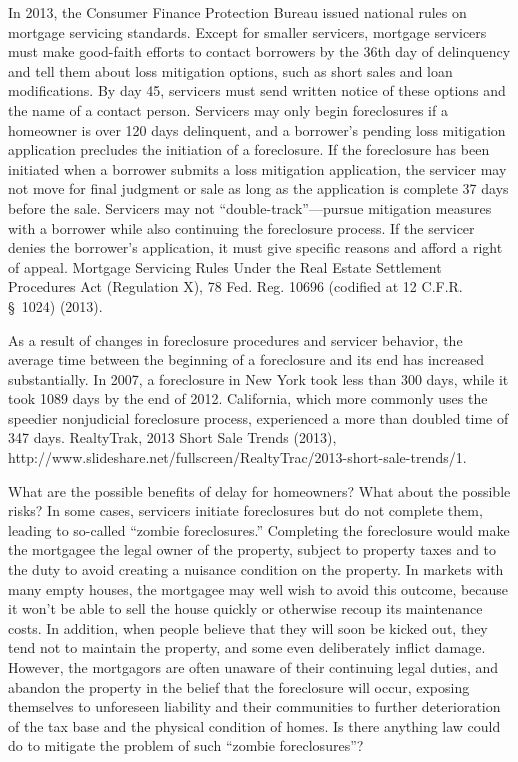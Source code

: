 In 2013, the Consumer Finance Protection Bureau issued national rules on
mortgage servicing standards. Except for smaller servicers, mortgage servicers
must make good-faith efforts to contact borrowers by the 36th
day of delinquency and tell them about loss mitigation options, such as short
sales and loan modifications. By day 45, servicers must send written notice of
these options and the name of a contact person. Servicers may only begin
foreclosures if a homeowner is over 120 days delinquent, and a borrower's
pending loss mitigation application precludes the initiation of a foreclosure. 
If the foreclosure has been initiated when a borrower submits a loss mitigation
application, the servicer may not move for final judgment or sale as long as
the application is complete 37 days before the sale. Servicers may not
``double-track''---pursue mitigation measures with a borrower while also
continuing the foreclosure process. If the servicer denies the borrower's
application, it must give specific reasons and afford a right of appeal. 
Mortgage Servicing Rules Under the Real Estate Settlement Procedures Act
(Regulation X), 78 Fed. Reg. 10696 (codified at 12 C.F.R. \S~1024) (2013).

As a result of changes in foreclosure procedures and servicer behavior, the
average time between the beginning of a foreclosure and its end has increased
substantially. In 2007, a foreclosure in New York took less than 300 days,
while it took 1089 days by the end of 2012. California, which more commonly
uses the speedier nonjudicial foreclosure process, experienced a more than
doubled time of 347 days. RealtyTrak,
2013
Short Sale Trends (2013),
http://www.slideshare.net/fullscreen/RealtyTrac/2013-short-sale-trends/1.

What are the possible benefits of delay for homeowners? What about the possible
risks? In some cases, servicers initiate foreclosures but do not complete
them, leading to so-called ``zombie foreclosures.'' Completing the foreclosure
would make the mortgagee the legal owner of the property, subject to property
taxes and to the duty to avoid creating a nuisance condition on the property. 
In markets with many empty houses, the mortgagee may well wish to avoid this
outcome, because it won't be able to sell the house quickly or otherwise recoup
its maintenance costs. In addition, when people believe that they will soon be
kicked out, they tend not to maintain the property, and some even deliberately
inflict damage. However, the mortgagors are often unaware of their continuing
legal duties, and abandon the property in the belief that the foreclosure will
occur, exposing themselves to unforeseen liability and their communities to
further deterioration of the tax base and the physical condition of homes. Is
there anything law could do to mitigate the problem of such ``zombie
foreclosures''?

